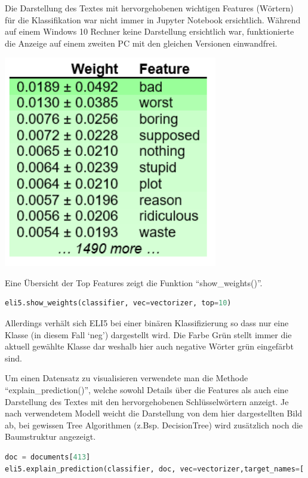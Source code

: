 \documentclass[
  12pt, %
  a4paper, %
  oneside, %
  openany, 
  numbers=noenddot, %
  BCOR=5mm, %
  parskip=half*, %
  thesis, %
]{bfhbook}
\begin{document}
\begin{myboxi}
Die Darstellung des Textes mit hervorgehobenen wichtigen Features (Wörtern) für die Klassifikation war nicht immer in Jupyter Notebook ersichtlich. Während auf einem Windows 10 Rechner keine Darstellung ersichtlich war, funktionierte die Anzeige auf einem zweiten PC mit den gleichen Versionen einwandfrei.
\end{myboxi}

\begin{center}
\begin{minipage}[t]{0.45\linewidth}
\vspace{0pt}
\centering
	\includegraphics[width=0.7\textwidth]{Bilder/MovieReviews-SentimentClassification_Weights.PNG}
\end{minipage}\hfill
\begin{minipage}[t]{0.45\linewidth}
\vspace{20pt}
Eine Übersicht der Top Features zeigt die Funktion ``show\_weights()''.
\begin{lstlisting}[language=Python]
eli5.show_weights(classifier, vec=vectorizer, top=10)
\end{lstlisting}
Allerdings verhält sich ELI5 bei einer binären Klassifizierung so dass nur eine Klasse (in diesem Fall `neg') dargestellt wird. Die Farbe Grün stellt immer die aktuell gewählte Klasse dar weshalb hier auch negative Wörter grün eingefärbt sind.
\end{minipage}
\end{center}

Um einen Datensatz zu visualisieren verwendete man die Methode ``explain\_prediction()'', welche sowohl Details über die Features als auch eine Darstellung des Textes mit den hervorgehobenen Schlüsselwörtern anzeigt. Je nach verwendetem Modell weicht die Darstellung von dem hier dargestellten Bild ab, bei gewissen Tree Algorithmen (z.Bsp. DecisionTree) wird zusätzlich noch die Baumstruktur angezeigt.
\begin{lstlisting}[language=Python]
doc = documents[413]
eli5.explain_prediction(classifier, doc, vec=vectorizer,target_names=['neg','pos'], top=20)
\end{lstlisting}
\end{document}
